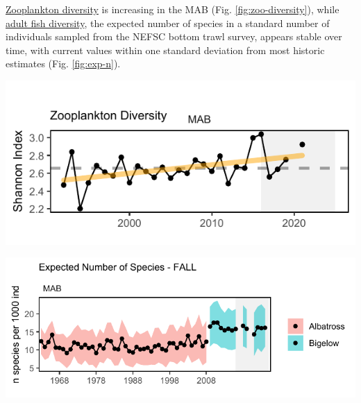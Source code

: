 \documentclass[
  10pt,
]{article}
\let\origfigure\figure
\let\endorigfigure\endfigure
\renewenvironment{figure}[1][2] {
    \expandafter\origfigure\expandafter[H]
} {
    \endorigfigure
}
\begin{document}
\href{https://noaa-edab.github.io/catalog/zoo_diversity.html}{Zooplankton diversity} is increasing in the MAB (Fig. \ref{fig:zoo-diversity}), while \href{https://noaa-edab.github.io/catalog/exp_n.html}{adult fish diversity}, the expected number of species in a standard number of individuals sampled from the NEFSC bottom trawl survey, appears stable over time, with current values within one standard deviation from most historic estimates (Fig. \ref{fig:exp-n}).

\begin{figure}

{\centering \includegraphics{midatlantic_files/figure-latex/zoo-diversity-1} 

}

\caption{Zooplankton diversity in the Mid-Atlantic Bight, Shannon diversity index (black) with significant increase (orange line).}\label{fig:zoo-diversity}
\end{figure}

\begin{figure}

{\centering \includegraphics{midatlantic_files/figure-latex/exp-n-1} 

}

\caption{Adult fish diversity in the Mid-Atlantic Bight, based on expected number of species. Results from survey vessels Albatross and Bigelow are reported separately due to catchability differences.}\label{fig:exp-n}
\end{figure}
\end{document}
